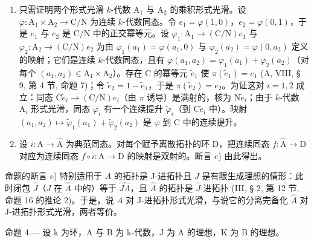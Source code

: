 \begin{enumerate}
\def\labelenumi{\alph{enumi})}
\setcounter{enumi}{1}
\item
  只需证明两个形式光滑 \(k\)-代数 \(\mathrm{A}_1\) 与 \(\mathrm{A}_2\) 的乘积形式光滑。设 \(\varphi : \mathrm{A}_1 \times \mathrm{A}_2 \to \mathrm{C} / \mathrm{N}\) 为连续 \(k\)-代数同态。令 \(e_1 = \varphi(1,0)\)，\(e_2 = \varphi(0,1)\)，于是 \(e_1\) 与 \(e_2\) 是 \(\mathrm{C} / \mathrm{N}\) 中的正交幂等元。设 \(\varphi_1 : \mathrm{A}_1 \to (\mathrm{C} / \mathrm{N})e_1\) 与 \(\varphi_2 : \mathrm{A}_2 \to (\mathrm{C} / \mathrm{N})e_2\) 为由 \(\varphi_1(a_1) = \varphi(a_1,0)\) 与 \(\varphi_2(a_2) = \varphi(0,a_2)\) 定义的映射；它们是连续 \(k\)-代数同态，且有 \(\varphi(a_1,a_2) = \varphi_1(a_1) + \varphi_2(a_2)\)（对每个 \((a_1,a_2) \in \mathrm{A}_1 \times \mathrm{A}_2\)）。存在 C 的幂等元 \(\tilde{e}_1\) 使 \(\pi(\tilde{e}_1) = e_1\) (A, VIII, § 9, 第 4 节, 命题 7)；令 \(\tilde{e}_2 = 1 - \tilde{e}_1\)，于是 \(\pi(\tilde{e}_2) = e_2\)。为证这对 \(i = 1,2\) 成立：同态 \(\mathrm{C}\tilde{e}_i \to (\mathrm{C} / \mathrm{N})e_i\)（由 \(\pi\) 诱导）是满射的，核为 \(\mathrm{N}\tilde{e}_i\)；由于 \(k\)-代数 \(\mathrm{A}_i\) 形式光滑，同态 \(\varphi_i\) 有一个连续提升 \(\tilde{\varphi}_i\)（到 \(\mathrm{C}\tilde{e}_i\) 中）。映射 \((a_1,a_2) \mapsto \tilde{\varphi}_1(a_1) + \tilde{\varphi}_2(a_2)\) 是 \(\varphi\) 到 C 中的连续提升。
\item
  设 \(i: \mathrm{A} \to \widehat{\mathrm{A}}\) 为典范同态。对每个赋予离散拓扑的环 D，把连续同态 \(f: \widehat{\mathrm{A}} \to \mathrm{D}\) 对应为连续同态 \(f \circ i: \mathrm{A} \to \mathrm{D}\) 的映射是双射的。断言 c) 由此得出。
\end{enumerate}

命题的断言 c) 特别适用于 \(A\) 的拓扑是 J-进拓扑且 \(J\) 是有限生成理想的情形：此时闭包 \(\widehat{J}\)（\(J\) 在 \(\widehat{A}\) 中的）等于 \(\widehat{JA}\)，且 \(\widehat{A}\) 的拓扑是 \(\widehat{J}\)-进拓扑 (III, § 2, 第 12 节, 命题 16 的推论 2)。于是，说 \(A\) 对 J-进拓扑形式光滑，与说它的分离完备化 \(\widehat{A}\) 对 J-进拓扑形式光滑，两者等价。

命题 4.--- 设 k 为环，A 与 B 为 k-代数，J 为 A 的理想，K 为 B 的理想。

